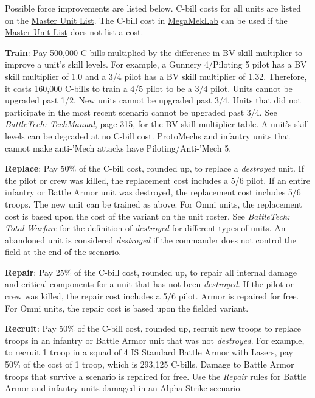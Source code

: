 Possible force improvements are listed below.
C-bill costs for all units are listed on the \href{http://www.masterunitlist.info}{Master Unit List}.
The C-bill cost in \href{https://megamek.org}{MegaMekLab} can be used if the \href{http://www.masterunitlist.info}{Master Unit List} does not list a cost.

\begin{description}

\item {\bfseries Train}: Pay 500,000 C-bills multiplied by the difference in BV skill multiplier to improve a unit's skill levels.
For example, a Gunnery 4/Piloting 5 pilot has a BV skill multiplier of 1.0 and a 3/4 pilot has a BV skill multiplier of 1.32.
Therefore, it costs 160,000 C-bills to train a 4/5 pilot to be a 3/4 pilot.
Units cannot be upgraded past 1/2.
New units cannot be upgraded past 3/4.
Units that did not participate in the most recent scenario cannot be upgraded past 3/4.
See \emph{BattleTech: TechManual}, page 315, for the BV skill multiplier table.
A unit's skill levels can be degraded at no C-bill cost.
ProtoMechs and infantry units that cannot make anti-'Mech attacks have Piloting/Anti-'Mech 5.

\item {\bfseries Replace}: Pay 50\% of the C-bill cost, rounded up, to replace a \emph{destroyed} unit.
If the pilot or crew was killed, the replacement cost includes a 5/6 pilot.
If an entire infantry or Battle Armor unit was destroyed, the replacement cost includes 5/6 troops.
The new unit can be trained as above.
For Omni units, the replacement cost is based upon the cost of the variant on the unit roster.
See \emph{BattleTech: Total Warfare} for the definition of \emph{destroyed} for different types of units.
An abandoned unit is considered \emph{destroyed} if the commander does not control the field at the end of the scenario.

\item {\bfseries Repair}: Pay 25\% of the C-bill cost, rounded up, to repair all internal damage and critical components for a unit that has not been \emph{destroyed}.
If the pilot or crew was killed, the repair cost includes a 5/6 pilot.
Armor is repaired for free.
For Omni units, the repair cost is based upon the fielded variant.

\item {\bfseries Recruit}: Pay 50\% of the C-bill cost, rounded up, recruit new troops to replace troops in an infantry or Battle Armor unit that was not \emph{destroyed}.
For example, to recruit 1 troop in a squad of 4 IS Standard Battle Armor with Lasers, pay 50\% of the cost of 1 troop, which is 293,125 C-bills.
Damage to Battle Armor troops that survive a scenario is repaired for free.
Use the \emph{Repair} rules for Battle Armor and infantry units damaged in an Alpha Strike scenario.


\end{description}

